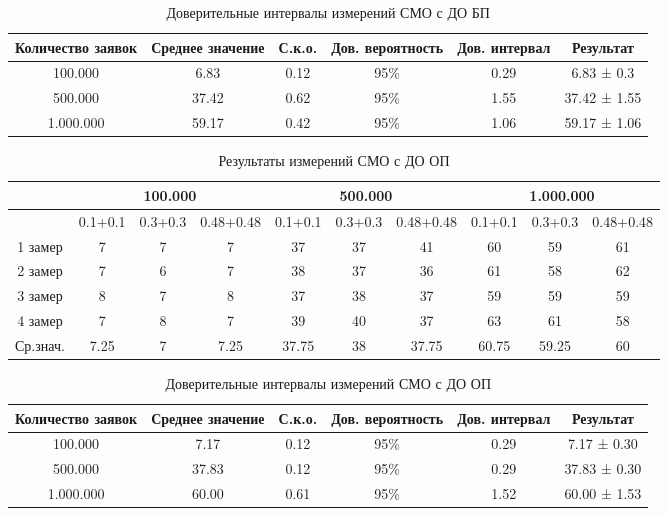 \documentclass[a4paper,14pt]{report} %
\begin{document}
\begin{table}[h!]
\caption{Доверительные интервалы измерений СМО с ДО БП}
\begin{tabular}{|c|c|c|c|c|c|}
\hline
 Количество заявок & Среднее значение & С.к.о. & Дов. вероятность & Дов. интервал & Результат\\
\hline
100.000 & 6.83 & 0.12 & 95\% & 0.29 & 6.83 ± 0.3 \\
\hline
500.000 & 37.42 & 0.62 & 95\% & 1.55 & 37.42 ± 1.55 \\
\hline
1.000.000 & 59.17  & 0.42 & 95\% & 1.06 & 59.17 ± 1.06 \\
\hline
\end{tabular}
\end{table} 

\begin{table}[h!]
\caption{Результаты измерений СМО с ДО ОП}
\begin{tabular}{|c|c|c|c|c|c|c|c|c|c|}
\hline
 & \multicolumn{3}{|c|}{100.000} & \multicolumn{3}{|c|}{500.000} & \multicolumn{3}{|c|}{1.000.000} \\
\hline
 & 0.1+0.1 & 0.3+0.3 & 0.48+0.48 & 0.1+0.1 & 0.3+0.3 & 0.48+0.48 & 0.1+0.1 & 0.3+0.3 & 0.48+0.48 \\
\hline
1 замер & 7  & 7 & 7 & 37 & 37 & 41 & 60 & 59 & 61  \\
\hline
2 замер &  7 & 6 & 7 & 38 & 37 & 36 & 61 & 58 & 62     \\
\hline
3 замер &  8 & 7 & 8 & 37 & 38 & 37 & 59 & 59 & 59  \\
\hline
4 замер &  7 & 8 & 7 & 39 & 40 & 37 & 63 & 61 & 58   \\
\hline
Ср.знач. & 7.25 & 7 & 7.25 & 37.75 & 38 & 37.75 & 60.75 & 59.25 & 60     \\
\hline
\end{tabular}
\end{table} 

\begin{table}[h!]
\caption{Доверительные интервалы измерений СМО с ДО ОП}
\begin{tabular}{|c|c|c|c|c|c|}
\hline
 Количество заявок & Среднее значение & С.к.о. & Дов. вероятность & Дов. интервал & Результат\\
\hline
100.000 & 7.17 & 0.12 & 95\% & 0.29 & 7.17 ± 0.30 \\
\hline
500.000 & 37.83 & 0.12 & 95\% & 0.29 & 37.83 ± 0.30 \\
\hline
1.000.000 & 60.00 & 0.61 & 95\% & 1.52 & 60.00  ± 1.53 \\
\hline
\end{tabular}
\end{table} 
\end{document}

